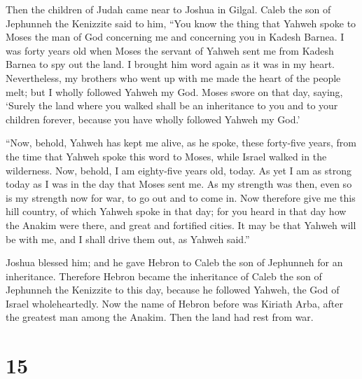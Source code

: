  Then the children of Judah came near to Joshua in Gilgal.
Caleb the son of Jephunneh the Kenizzite said to him, ``You know the
thing that Yahweh spoke to Moses the man of God concerning me and
concerning you in Kadesh Barnea.  I was forty years old
when Moses the servant of Yahweh sent me from Kadesh Barnea to spy out
the land. I brought him word again as it was in my heart. 
Nevertheless, my brothers who went up with me made the heart of the
people melt; but I wholly followed Yahweh my God.  Moses
swore on that day, saying, `Surely the land where you walked shall be an
inheritance to you and to your children forever, because you have wholly
followed Yahweh my God.'

 ``Now, behold, Yahweh has kept me alive, as he spoke,
these forty-five years, from the time that Yahweh spoke this word to
Moses, while Israel walked in the wilderness. Now, behold, I am
eighty-five years old, today.  As yet I am as strong
today as I was in the day that Moses sent me. As my strength was then,
even so is my strength now for war, to go out and to come in.
 Now therefore give me this hill country, of which Yahweh
spoke in that day; for you heard in that day how the Anakim were there,
and great and fortified cities. It may be that Yahweh will be with me,
and I shall drive them out, as Yahweh said.''

 Joshua blessed him; and he gave Hebron to Caleb the son
of Jephunneh for an inheritance.  Therefore Hebron became
the inheritance of Caleb the son of Jephunneh the Kenizzite to this day,
because he followed Yahweh, the God of Israel wholeheartedly.
 Now the name of Hebron before was Kiriath Arba, after
the greatest man among the Anakim. Then the land had rest from war.

\hypertarget{section-14}{%
\section{15}\label{section-14}}

